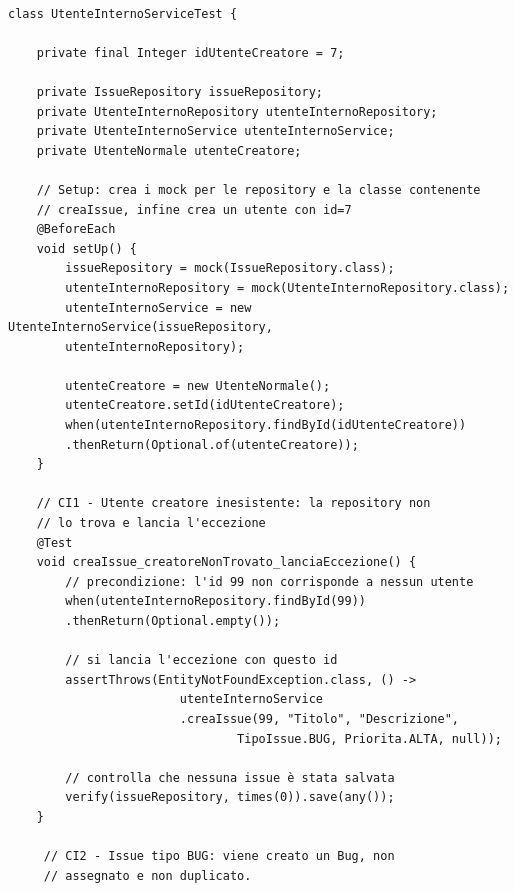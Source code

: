 \begin{listing}[!ht]
\begin{verbatim}

class UtenteInternoServiceTest {

    private final Integer idUtenteCreatore = 7;

    private IssueRepository issueRepository;
    private UtenteInternoRepository utenteInternoRepository;
    private UtenteInternoService utenteInternoService;
    private UtenteNormale utenteCreatore;

    // Setup: crea i mock per le repository e la classe contenente 
    // creaIssue, infine crea un utente con id=7
    @BeforeEach
    void setUp() {
        issueRepository = mock(IssueRepository.class);
        utenteInternoRepository = mock(UtenteInternoRepository.class);
        utenteInternoService = new UtenteInternoService(issueRepository, 
        utenteInternoRepository);

        utenteCreatore = new UtenteNormale();
        utenteCreatore.setId(idUtenteCreatore);
        when(utenteInternoRepository.findById(idUtenteCreatore))
        .thenReturn(Optional.of(utenteCreatore));
    }

    // CI1 - Utente creatore inesistente: la repository non 
    // lo trova e lancia l'eccezione
    @Test
    void creaIssue_creatoreNonTrovato_lanciaEccezione() {
        // precondizione: l'id 99 non corrisponde a nessun utente
        when(utenteInternoRepository.findById(99))
        .thenReturn(Optional.empty());

        // si lancia l'eccezione con questo id
        assertThrows(EntityNotFoundException.class, () ->
                        utenteInternoService
                        .creaIssue(99, "Titolo", "Descrizione",
                                TipoIssue.BUG, Priorita.ALTA, null));

        // controlla che nessuna issue è stata salvata
        verify(issueRepository, times(0)).save(any());
    }

     // CI2 - Issue tipo BUG: viene creato un Bug, non 
     // assegnato e non duplicato.

\end{verbatim}
\end{listing}

\clearpage

